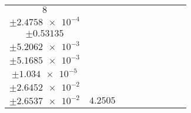 \documentclass[8pt]{article}
\begin{document}
\begin{longtable}[l]{c c c c c c c c c}
$\num{8}$ & \begin{tabular}[c]{@{}c@{}}$\num{3.14e-2}$ \\ $\pm\num{2.4758e-4}$\end{tabular} & \begin{tabular}[c]{@{}c@{}}$\num{-0.36016}$ \\ $\pm\num{0.53135}$\end{tabular} & \begin{tabular}[c]{@{}c@{}}$\num{7.4079}$ \\ $\pm\num{5.2062e-3}$\end{tabular} & \begin{tabular}[c]{@{}c@{}}$\num{2.9641e+3}$ \\ $\pm\num{5.1685e-3}$\end{tabular} & \begin{tabular}[c]{@{}c@{}}$\num{5.9298}$ \\ $\pm\num{1.034e-5}$\end{tabular} & \begin{tabular}[c]{@{}c@{}}$\num{3.5693}$ \\ $\pm\num{2.6452e-2}$\end{tabular} & \begin{tabular}[c]{@{}c@{}}$\num{3.5632}$ \\ $\pm\num{2.6537e-2}$\end{tabular} & $\num{4.2505}$\\
\bottomrule
\end{longtable}
\end{document}
